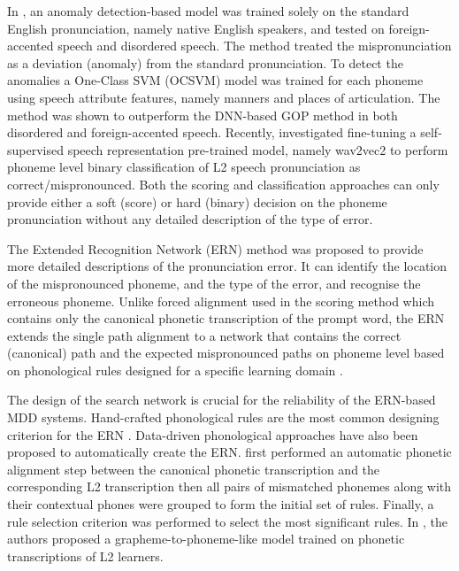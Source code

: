 \documentclass[12pt]{elsarticle}
\begin{document}
In \cite{RN44}, an anomaly detection-based model was trained solely on the standard English pronunciation, namely native English speakers, and tested on foreign-accented speech and disordered speech. The method treated the mispronunciation as a deviation (anomaly) from the standard pronunciation. To detect the anomalies a One-Class SVM (OCSVM) model was trained for each phoneme using speech attribute features, namely manners and places of articulation. The method was shown to outperform the DNN-based GOP method in both disordered and foreign-accented speech.
Recently, \cite{RN46} investigated fine-tuning a self-supervised speech representation pre-trained model, namely wav2vec2 \cite{RN127} to perform phoneme level binary classification of L2 speech pronunciation as correct/mispronounced.
Both the scoring and classification approaches can only provide either a soft (score) or hard (binary) decision on the phoneme pronunciation without any detailed description of the type of error. 

The Extended Recognition Network (ERN) method was proposed to provide more detailed descriptions of the pronunciation error. It can identify the location of the mispronounced phoneme, and the type of the error, and recognise the erroneous phoneme. Unlike forced alignment used in the scoring method which contains only the canonical phonetic transcription of the prompt word, the ERN extends the single path alignment to a network that contains the correct (canonical) path and the expected mispronounced paths on phoneme level based on phonological rules designed for a specific learning domain \cite{RN33, RN37, RN42}.

The design of the search network is crucial for the reliability of the ERN-based MDD systems. Hand-crafted phonological rules are the most common designing criterion for the ERN \cite{RN42, RN37, RN45, RN33, RN34}. Data-driven phonological approaches have also been proposed to automatically create the ERN. \cite{RN94} first performed an automatic phonetic alignment step between the canonical phonetic transcription and the corresponding L2 transcription then all pairs of mismatched phonemes along with their contextual phones were grouped to form the initial set of rules. Finally, a rule selection criterion was performed to select the most significant rules. In \cite{RN129}, the authors proposed a grapheme-to-phoneme-like model trained on phonetic transcriptions of L2 learners.
\end{document}

